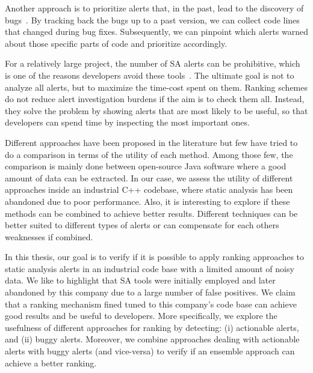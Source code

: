 Another approach is to prioritize alerts that, in the past, lead to the discovery of bugs~\cite{which_warnings,automatic_training_set}. By tracking back the bugs up to a past version, we can collect code lines that changed during bug fixes. Subsequently, we can pinpoint which alerts warned about those specific parts of code and prioritize accordingly.

For a relatively large project, the number of SA alerts can be prohibitive, which is one of the reasons developers avoid these tools~\cite{why_dont_use}. The ultimate goal is not to analyze all alerts, but to maximize the time-cost spent on them. Ranking schemes do not reduce alert investigation burdens if the aim is to check them all. Instead, they solve the problem by showing alerts that are most likely to be useful, so that developers can spend time by inspecting the most important ones.

Different approaches have been proposed in the literature but few have tried to do a comparison in terms of the utility of each method. Among those few, the comparison is mainly done between open-source Java software where a good amount of data can be extracted. In our case, we assess the utility of different approaches inside an industrial C++ codebase, where static analysis has been abandoned due to poor performance. Also, it is interesting to explore if these methods can be combined to achieve better results. Different techniques can be better suited to different types of alerts or can compensate for each others weaknesses if combined.




In this thesis, our goal is to verify if it is possible to apply ranking approaches to static analysis alerts in an industrial code base with a limited amount of noisy data. We like to highlight that SA tools were initially employed and later abandoned by this company due to a large number of false positives. We claim that a ranking mechanism fined tuned to this company's code base can achieve good results and be useful to developers. More specifically, we explore the usefulness of different approaches for ranking by detecting: (i) actionable alerts, and (ii) buggy alerts. Moreover, we combine approaches dealing with actionable alerts with buggy alerts (and vice-versa) to verify if an ensemble approach can achieve a better ranking. 

